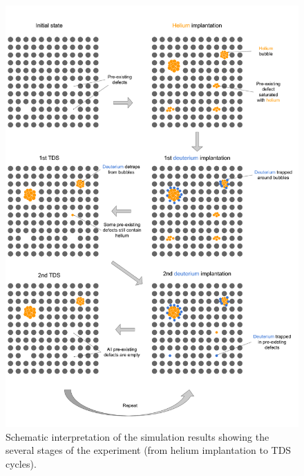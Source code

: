 \begin{figure}
    \centering
    \includegraphics[width=\linewidth]{Figures/Chapter5/sketch ialovega experiment.pdf}
    \caption{Schematic interpretation of the simulation results showing the several stages of the experiment (from helium implantation to TDS cycles).}
\end{figure}
